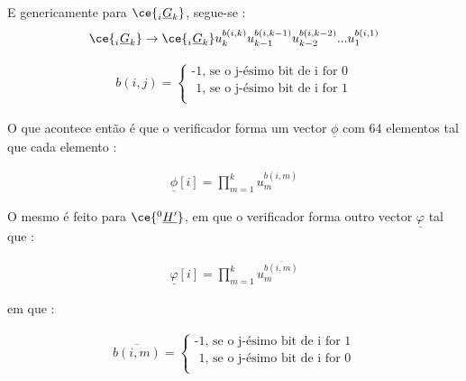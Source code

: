 E genericamente para $\ce{^{\ }_{i}\underline{G}_{k}}$, segue-se : \newline
\begin{align*}
\ce{^{\ }_{i}\underline{G}_{k}} \rightarrow \ce{^{\ }_{i}\underline{G}_{k}}u_{k}^{b(i,k)}u_{k-1}^{b(i,k-1)}u_{k-2}^{b(i,k-2)}...u_{1}^{b(i,1)}
\end{align*}

\begin{align*}
 b(i,j)=
 \begin{cases} 
      \text{-1, se o j-ésimo bit de i for 0} \\
      \text{ 1, se o j-ésimo bit de i for 1} \\
 \end{cases}
\end{align*}

O que acontece então é que o verificador forma um vector $\underline{\phi}$ com 64 elementos tal que cada elemento :

\begin{align*}
 \underline{\phi}[i]=\prod_{m=1}^{k} u_{m}^{b(i,m)}
\end{align*}

O mesmo é feito para $\ce{^{0}_{\ }\underline{H'}}$, em que o verificador forma outro vector $\underline{\varphi}$ tal que : 

\begin{align*}
 \underline{\varphi}[i]=\prod_{m=1}^{k} u_{m}^\overline{b(i,m)}
\end{align*}

em que :

\begin{align*}
 \overline{b(i,m)}=
 \begin{cases} 
      \text{-1, se o j-ésimo bit de i for 1} \\
      \text{ 1, se o j-ésimo bit de i for 0} \\
 \end{cases}
\end{align*}

